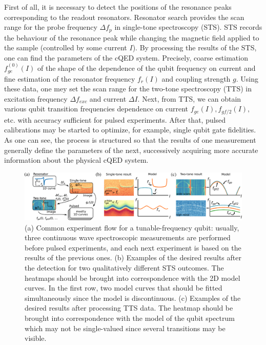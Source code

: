 \documentclass[%
 aip,
 amsmath,amssymb,
 reprint,%
]{revtex4-1}
\begin{document}
First of all, it is necessary to detect the positions of the resonance peaks corresponding to the readout resonators. Resonator search provides the scan range for the probe frequency $\Delta f_p$ in single-tone spectroscopy (STS). STS records the behaviour of the resonance peak while changing the magnetic field applied to the sample  (controlled by some current $I$). By processing the results of the STS, one can find the parameters of the cQED system. Precisely, coarse estimation $f^{(0)}_{ge}(I)$ of the shape of the dependence of the qubit frequency on current and fine estimation of the resonator frequency $f_r(I)$ and coupling strength $g$. Using these data, one mey set the scan range for the two-tone spectroscopy (TTS) in excitation frequency $\Delta f_{exc}$ and current $\Delta I$. Next, from TTS, we can obtain various qubit transition frequencies dependence on current $f_{ge}(I), f_{gf/2}(I),$ etc. with accuracy sufficient for pulsed experiments.  After that, pulsed calibrations may be started to optimize, for example, single qubit gate fidelities. As one can see, the process is structured so that the results of one measurement generally define the parameters of the next, successively acquiring more accurate information about the physical cQED system.

\begin{figure}
	\centering
	\includegraphics[width=\linewidth]{detection}
	\caption{(a) Common experiment flow for a tunable-frequency qubit: usually, three continuous wave spectroscopic measurements are performed before pulsed experiments, and each next experiment is based on the results of the previous ones. (b) Examples of the desired results after the detection for two qualitatively different STS outcomes. The heatmaps should be brought into correspondence with the 2D model curves. In the first row, two model curves that should be fitted simultaneously since the model is discontinuous. (c) Examples of the desired results after processing TTS data. The heatmap should be brought into correspondence with the model of the qubit spectrum which may not be single-valued since several transitions may be visible.}
	\label{fig:detection}	
\end{figure} 
\end{document}
